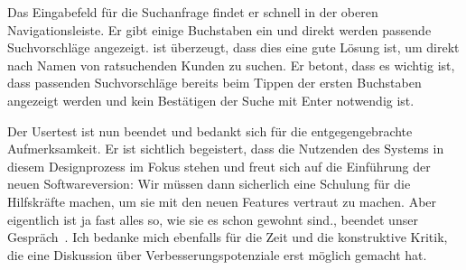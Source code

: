 Das Eingabefeld für die Suchanfrage findet er schnell in der oberen
Navigationsleiste. Er gibt einige Buchstaben ein und direkt werden passende
Suchvorschläge angezeigt. \ipName ist überzeugt, dass dies eine gute Lösung
ist, um direkt nach Namen von ratsuchenden Kunden zu suchen. Er betont, dass es
wichtig ist, dass passenden Suchvorschläge bereits beim Tippen der ersten
Buchstaben angezeigt werden und kein Bestätigen der Suche mit Enter notwendig
ist.

Der Usertest ist nun beendet und \ipName bedankt sich für die entgegengebrachte
Aufmerksamkeit. Er ist sichtlich begeistert, dass die Nutzenden des Systems in
diesem Designprozess im Fokus stehen und freut sich auf die Einführung der
neuen Softwareversion: \glqq{}Wir müssen dann sicherlich eine Schulung für die
Hilfskräfte machen, um sie mit den neuen Features vertraut zu machen. Aber
eigentlich ist ja fast alles so, wie sie es schon gewohnt sind.\grqq{}, beendet
\ipName unser Gespräch~\cite{clavesUsertest}. Ich bedanke mich ebenfalls für die Zeit und die
konstruktive Kritik, die eine Diskussion über Verbesserungspotenziale erst
möglich gemacht hat.